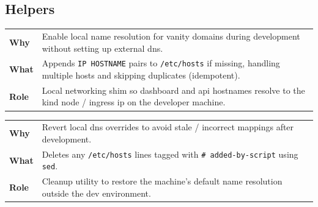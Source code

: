 \documentclass[11pt, a4paper, oneside, listof=totoc]{scrartcl}
\makeatletter
\newcommand{\codesummary}[3]{%
    \vspace{0.4\baselineskip}%
    \noindent\begin{tabularx}{\linewidth}{@{}>{\bfseries}l X@{}}
    Why  & #1\\
    What & #2\\
    Role & #3\\
    \end{tabularx}%
    \vspace{0.2\baselineskip}%
}
\makeatother
\begin{document}
        \clearpage

            \subsection{Helpers}
                \codesummary
                    {Enable local name resolution for vanity domains during development without setting up external \gls{dns}.}
                    {Appends \texttt{IP HOSTNAME} pairs to \texttt{/etc/hosts} if missing, handling multiple hosts and skipping duplicates (idempotent).}
                    {Local networking shim so dashboard and \gls{api} hostnames resolve to the \gls{kind} node / ingress \gls{ip} on the developer machine.}

        \clearpage

                \codesummary
                    {Revert local \gls{dns} overrides to avoid stale / incorrect mappings after development.}
                    {Deletes any \texttt{/etc/hosts} lines tagged with \texttt{\# added-by-script} using \texttt{sed}.}
                    {Cleanup utility to restore the machine's default name resolution outside the dev environment.}
\end{document}
